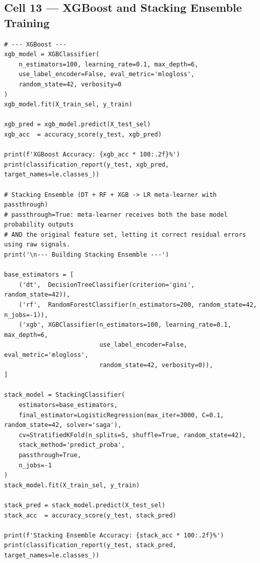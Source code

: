\documentclass[12pt,a4paper]{article}
\begin{document}
\vspace{1.5cm}
\subsection{Cell 13 --- XGBoost and Stacking Ensemble Training}

\begin{lstlisting}[caption=Cell 13: XGBoost Classifier and Stacking Ensemble]
# --- XGBoost ---
xgb_model = XGBClassifier(
    n_estimators=100, learning_rate=0.1, max_depth=6,
    use_label_encoder=False, eval_metric='mlogloss',
    random_state=42, verbosity=0
)
xgb_model.fit(X_train_sel, y_train)

xgb_pred = xgb_model.predict(X_test_sel)
xgb_acc  = accuracy_score(y_test, xgb_pred)

print(f'XGBoost Accuracy: {xgb_acc * 100:.2f}%')
print(classification_report(y_test, xgb_pred, target_names=le.classes_))

# Stacking Ensemble (DT + RF + XGB -> LR meta-learner with passthrough)
# passthrough=True: meta-learner receives both the base model probability outputs
# AND the original feature set, letting it correct residual errors using raw signals.
print('\n--- Building Stacking Ensemble ---')

base_estimators = [
    ('dt',  DecisionTreeClassifier(criterion='gini', random_state=42)),
    ('rf',  RandomForestClassifier(n_estimators=200, random_state=42, n_jobs=-1)),
    ('xgb', XGBClassifier(n_estimators=100, learning_rate=0.1, max_depth=6,
                          use_label_encoder=False, eval_metric='mlogloss',
                          random_state=42, verbosity=0)),
]

stack_model = StackingClassifier(
    estimators=base_estimators,
    final_estimator=LogisticRegression(max_iter=3000, C=0.1, random_state=42, solver='saga'),
    cv=StratifiedKFold(n_splits=5, shuffle=True, random_state=42),
    stack_method='predict_proba',
    passthrough=True,
    n_jobs=-1
)
stack_model.fit(X_train_sel, y_train)

stack_pred = stack_model.predict(X_test_sel)
stack_acc  = accuracy_score(y_test, stack_pred)

print(f'Stacking Ensemble Accuracy: {stack_acc * 100:.2f}%')
print(classification_report(y_test, stack_pred, target_names=le.classes_))
\end{lstlisting}
\end{document}
